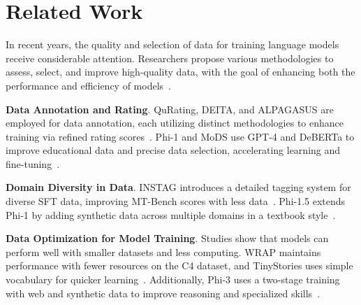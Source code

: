 \documentclass[11pt]{article}
\begin{document}
\section{Related Work}
\label{sec:relatedwork}

In recent years, the quality and selection of data for training language models receive considerable attention. Researchers propose various methodologies to assess, select, and improve high-quality data, with the goal of enhancing both the performance and efficiency of models~\cite{elazar2023s, longpre2023pretrainer, xie2023data, li2024datacomp}.

\textbf{Data Annotation and Rating}. QuRating, DEITA, and ALPAGASUS are employed for data annotation, each utilizing distinct methodologies to enhance training via refined rating scores~\cite{wettig2024qurating, liu2023makes, chen2023alpagasus}. Phi-1 and MoDS use GPT-4 and DeBERTa to improve educational data and precise data selection, accelerating learning and fine-tuning~\citep{gunasekar2023textbooks, du2023mods}.

\textbf{Domain Diversity in Data}. INSTAG introduces a detailed tagging system for diverse SFT data, improving MT-Bench scores with less data~\citep{lu2023instag}. Phi-1.5 extends Phi-1 by adding synthetic data across multiple domains in a textbook style~\citep{li2023textbooks}.

\textbf{Data Optimization for Model Training}.  
Studies show that models can perform well with smaller datasets and less computing. WRAP maintains performance with fewer resources on the C4 dataset, and TinyStories uses simple vocabulary for quicker learning~\citep{maini2024rephrasing, eldan2023tinystories}. Additionally, Phi-3 uses a two-stage training with web and synthetic data to improve reasoning and specialized skills~\citep{abdin2024phi}.

\end{document}
